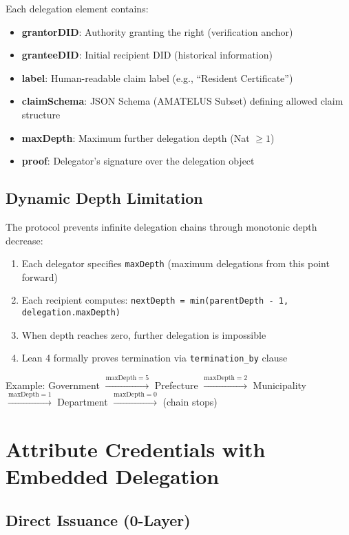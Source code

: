 Each delegation element contains:

\begin{itemize}
  \item \textbf{grantorDID}: Authority granting the right (verification anchor)
  \item \textbf{granteeDID}: Initial recipient DID (historical information)
  \item \textbf{label}: Human-readable claim label (e.g., ``Resident Certificate'')
  \item \textbf{claimSchema}: JSON Schema (AMATELUS Subset) defining allowed claim structure
  \item \textbf{maxDepth}: Maximum further delegation depth (Nat $\geq 1$)
  \item \textbf{proof}: Delegator's signature over the delegation object
\end{itemize}

\subsection{Dynamic Depth Limitation}

The protocol prevents infinite delegation chains through monotonic depth decrease:

\begin{enumerate}
  \item Each delegator specifies \texttt{maxDepth} (maximum delegations from this point forward)
  \item Each recipient computes: \texttt{nextDepth = min(parentDepth - 1, delegation.maxDepth)}
  \item When depth reaches zero, further delegation is impossible
  \item Lean 4 formally proves termination via \texttt{termination\_by} clause
\end{enumerate}

Example: Government $\xrightarrow{\text{maxDepth}=5}$ Prefecture $\xrightarrow{\text{maxDepth}=2}$ Municipality $\xrightarrow{\text{maxDepth}=1}$ Department $\xrightarrow{\text{maxDepth}=0}$ (chain stops)

\section{Attribute Credentials with Embedded Delegation}

\subsection{Direct Issuance (0-Layer)}


